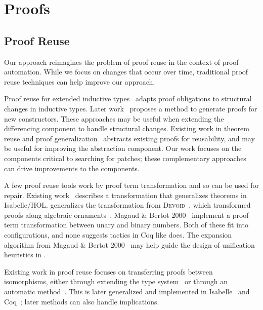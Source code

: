 \section{Proofs}

\subsection*{Proof Reuse}


Our approach reimagines the problem of proof reuse in the context of proof automation.
While we focus on changes that occur over time, traditional proof reuse techniques can help
improve our approach.

Proof reuse for extended inductive types~\cite{Boite2004} adapts proof obligations
to structural changes in inductive types. Later work~\cite{Mulhern06proofweaving} proposes a method
to generate proofs for new constructors. These approaches may be useful when extending the differencing
component to handle structural changes. Existing work in theorem reuse and proof generalization~\cite{Felty1994, pons00, Johnsen2004} abstracts existing proofs for reusability, and may be useful
for improving the abstraction component.
Our work focuses on the components critical to searching for patches; these complementary approaches
can drive improvements to the components.


A few proof reuse tools work by proof term transformation and so can be used for repair.
Existing work~\cite{Johnsen2004} describes a transformation that generalizes theorems in Isabelle/HOL.
\toolnamec generalizes the transformation from \textsc{Devoid}~\cite{Ringer2019},
which transformed proofs along algebraic ornaments~\cite{mcbride}.
Magaud \& Bertot 2000~\cite{magaud2000changing} implement a proof term transformation between
unary and binary numbers. 
Both of these fit into \toolnamec configurations,
and none suggests tactics in Coq like \toolnamec does.
The expansion algorithm from Magaud \& Bertot 2000~\cite{magaud2000changing} may help guide the design
of unification heuristics in \toolnamec.


Existing work in proof reuse focuses on transferring proofs between isomorphisms,
either through extending the type system~\cite{Barthe:2001:TIP:646793.704711} or through an automatic method~\cite{Magaud2002}.
This is later generalized and implemented in Isabelle~\cite{Huffman2013} and Coq~\cite{ZimmermannH15, tabareau:hal-01559073};
later methods can also handle implications.

